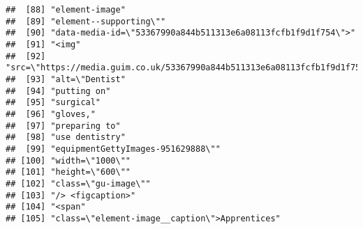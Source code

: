 \documentclass[]{article}
\begin{document}
\begin{verbatim}
##  [88] "element-image"                                                                                                                            
##  [89] "element--supporting\""                                                                                                                    
##  [90] "data-media-id=\"53367990a844b511313e6a08113fcfb1f9d1f754\">"                                                                              
##  [91] "<img"                                                                                                                                     
##  [92] "src=\"https://media.guim.co.uk/53367990a844b511313e6a08113fcfb1f9d1f754/0_0_5600_3360/1000.jpg\""                                         
##  [93] "alt=\"Dentist"                                                                                                                            
##  [94] "putting on"                                                                                                                               
##  [95] "surgical"                                                                                                                                 
##  [96] "gloves,"                                                                                                                                  
##  [97] "preparing to"                                                                                                                             
##  [98] "use dentistry"                                                                                                                            
##  [99] "equipmentGettyImages-951629888\""                                                                                                         
## [100] "width=\"1000\""                                                                                                                           
## [101] "height=\"600\""                                                                                                                           
## [102] "class=\"gu-image\""                                                                                                                       
## [103] "/> <figcaption>"                                                                                                                          
## [104] "<span"                                                                                                                                    
## [105] "class=\"element-image__caption\">Apprentices"                                                                                             

\end{verbatim}
\end{document}
